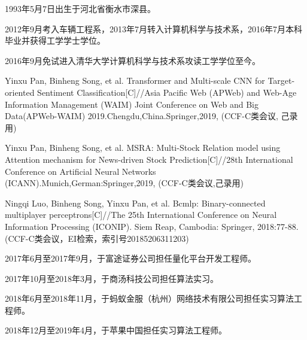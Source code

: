\begin{resume}


  1993年5月7日出生于河北省衡水市深县。

  2012年9月考入车辆工程系，2013年7月转入计算机科学与技术系，2016年7月本科毕业并获得工学学士学位。

  2016年9月免试进入清华大学计算机科学与技术系攻读工学学位至今。


  \begin{publications}[before=\publicationskip,after=\publicationskip]
    \item Yinxu Pan, Binheng Song, et al. Transformer and Multi-scale CNN for Target-oriented Sentiment Classification[C]//Asia Pacific Web (APWeb) and Web-Age Information Management (WAIM) Joint Conference on Web and Big Data(APWeb-WAIM) 2019.Chengdu,China.Springer,2019, (CCF-C类会议, 己录用)
    \item Yinxu Pan, Binheng Song, et al. MSRA: Multi-Stock Relation model using Attention mechanism for News-driven Stock Prediction[C]//28th International Conference on Artificial Neural Networks (ICANN).Munich,German:Springer,2019, (CCF-C类会议,己录用)
    \item Ningqi Luo, Binheng Song, Yinxu Pan, et al. Bcmlp: Binary-connected multiplayer perceptrons[C]//The 25th International Conference on Neural Information Processing (ICONIP). Siem Reap, Cambodia: Springer, 2018:77-88. (CCF-C类会议，EI检索，索引号20185206311203)
  \end{publications}



  \begin{achievements}
    \item 2017年6月至2017年9月，于富途证券公司担任量化平台开发工程师。
    \item 2017年10月至2018年3月，于商汤科技公司担任算法实习。
    \item 2018年6月至2018年11月，于蚂蚁金服（杭州）网络技术有限公司担任实习算法工程师。
    \item 2018年12月至2019年4月，于苹果中国担任实习算法工程师。
  \end{achievements}

\end{resume}
